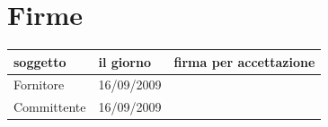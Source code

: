 \documentclass[a4paper, 12pt]{report}
\begin{document}
\section*{Firme}
\begin{table}[h!]
  \begin{center}
    \begin{tabular}{| l | l | p{60mm} |}
    \hline
    \textbf{soggetto} & \textbf{il giorno} & \textbf{firma per accettazione} \\
	\hline    
	Fornitore & 16/09/2009 &  \\
	\hline
	\hline
	Committente & 16/09/2009 &  \\
    \hline
    \end{tabular}
  \end{center}
\end{table}
\newpage
\end{document}

